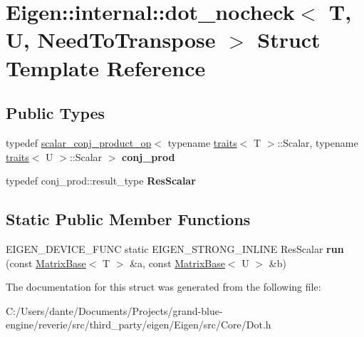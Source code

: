 \hypertarget{struct_eigen_1_1internal_1_1dot__nocheck}{}\section{Eigen\+::internal\+::dot\+\_\+nocheck$<$ T, U, Need\+To\+Transpose $>$ Struct Template Reference}
\label{struct_eigen_1_1internal_1_1dot__nocheck}
\subsection*{Public Types}
\begin{DoxyCompactItemize}
\item 
\mbox{\label{struct_eigen_1_1internal_1_1dot__nocheck_abf2c27baaf29d5b30c6e6c4683e4b85a}} 
typedef \mbox{\hyperlink{struct_eigen_1_1internal_1_1scalar__conj__product__op}{scalar\+\_\+conj\+\_\+product\+\_\+op}}$<$ typename \mbox{\hyperlink{struct_eigen_1_1internal_1_1traits}{traits}}$<$ T $>$\+::Scalar, typename \mbox{\hyperlink{struct_eigen_1_1internal_1_1traits}{traits}}$<$ U $>$\+::Scalar $>$ {\bfseries conj\+\_\+prod}
\item 
\mbox{\label{struct_eigen_1_1internal_1_1dot__nocheck_a13097f7d273a417cbdc3556f5e500c42}} 
typedef conj\+\_\+prod\+::result\+\_\+type {\bfseries Res\+Scalar}
\end{DoxyCompactItemize}
\subsection*{Static Public Member Functions}
\begin{DoxyCompactItemize}
\item 
\mbox{\label{struct_eigen_1_1internal_1_1dot__nocheck_a0cbd69a6c59affd92970f3b66b209c86}} 
E\+I\+G\+E\+N\+\_\+\+D\+E\+V\+I\+C\+E\+\_\+\+F\+U\+NC static E\+I\+G\+E\+N\+\_\+\+S\+T\+R\+O\+N\+G\+\_\+\+I\+N\+L\+I\+NE Res\+Scalar {\bfseries run} (const \mbox{\hyperlink{class_eigen_1_1_matrix_base}{Matrix\+Base}}$<$ T $>$ \&a, const \mbox{\hyperlink{class_eigen_1_1_matrix_base}{Matrix\+Base}}$<$ U $>$ \&b)
\end{DoxyCompactItemize}


The documentation for this struct was generated from the following file\+:\begin{DoxyCompactItemize}
\item 
C\+:/\+Users/dante/\+Documents/\+Projects/grand-\/blue-\/engine/reverie/src/third\+\_\+party/eigen/\+Eigen/src/\+Core/Dot.\+h\end{DoxyCompactItemize}

